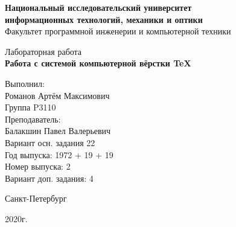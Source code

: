 \thispagestyle{empty}
\begin{center}
    {\bfseries Национальный исследовательский университет \\
    информационных технологий, механики и оптики}\\
    Факультет программной инженерии и компьютерной техники

    \vspace{20em}

    {\large Лабораторная работа }\\
    {\Large \textbf{Работа с системой компьютерной вёрстки \TeX}}
\end{center}

\vspace{15em}

\begin{flushright}
    Выполнил:\\
    Романов Артём Максимович\\
    Группа P3110\\
    Преподаватель:\\
    Балакшин Павел Валерьевич\\
    Вариант осн. задания 22\\
    Год выпуска: 1972 + 19 + 19\\
    Номер выпуска: 2 \\
    Вариант доп. задания: 4 
\end{flushright}

\vspace{\fill}

\begin{center}
Санкт-Петербург

2020г.
\end{center}